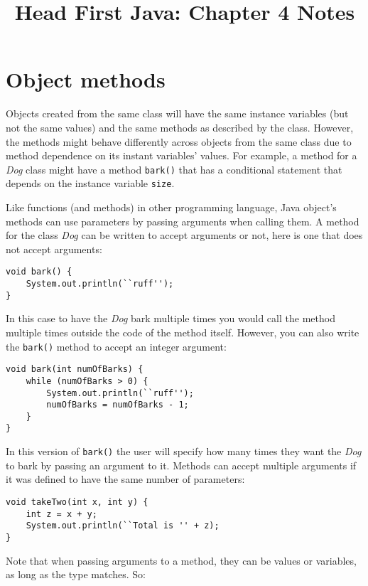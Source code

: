 \documentclass{tufte-handout}
\title{Head First Java: Chapter 4 Notes}
\begin{document}
    \maketitle

    \section*{Object methods}
    Objects created from the same class will have the same instance variables (but not the same values) and the same methods as described by the class. However, the methods might behave differently across objects from the same class due to method dependence on its instant variables' values. For example, a method for a \emph{Dog} class might have a method \texttt{bark()} that has a conditional statement that depends on the instance variable \texttt{size}.

    Like functions (and methods) in other programming language, Java object's methods can use parameters by passing arguments when calling them. A method for the class \emph{Dog} can be written to accept arguments or not, here is one that does not accept arguments:

    \begin{lstlisting}
void bark() {
    System.out.println(``ruff'');
}
    \end{lstlisting}

    In this case to have the \emph{Dog} bark multiple times you would call the method multiple times outside the code of the method itself. However, you can also write the \texttt{bark()} method to accept an integer argument:

    \begin{lstlisting}
void bark(int numOfBarks) {
    while (numOfBarks > 0) {
        System.out.println(``ruff'');
        numOfBarks = numOfBarks - 1;
    }
}
    \end{lstlisting}

    In this version of \texttt{bark()} the user will specify how many times they want the \emph{Dog} to bark by passing an argument to it. Methods can accept multiple arguments if it was defined to have the same number of parameters:

    \begin{lstlisting}
void takeTwo(int x, int y) {
    int z = x + y;
    System.out.println(``Total is '' + z);
}
    \end{lstlisting}

    Note that when passing arguments to a method, they can be values or variables, as long as the type matches. So:
\end{document}
